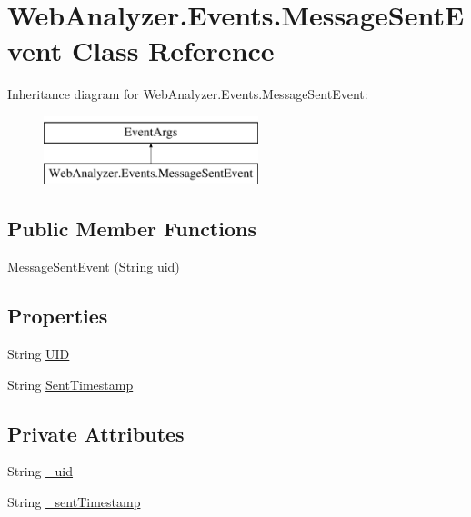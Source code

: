 \hypertarget{class_web_analyzer_1_1_events_1_1_message_sent_event}{}\section{Web\+Analyzer.\+Events.\+Message\+Sent\+Event Class Reference}
\label{class_web_analyzer_1_1_events_1_1_message_sent_event}
Inheritance diagram for Web\+Analyzer.\+Events.\+Message\+Sent\+Event\+:\begin{figure}[H]
\begin{center}
\leavevmode
\includegraphics[height=2.000000cm]{class_web_analyzer_1_1_events_1_1_message_sent_event}
\end{center}
\end{figure}
\subsection*{Public Member Functions}
\begin{DoxyCompactItemize}
\item 
\hyperlink{class_web_analyzer_1_1_events_1_1_message_sent_event_a20f49da5ed8a32d8af10923a0e3b1f0b}{Message\+Sent\+Event} (String uid)
\end{DoxyCompactItemize}
\subsection*{Properties}
\begin{DoxyCompactItemize}
\item 
String \hyperlink{class_web_analyzer_1_1_events_1_1_message_sent_event_a04217696019822bcc61e6890810b8442}{U\+I\+D}
\item 
String \hyperlink{class_web_analyzer_1_1_events_1_1_message_sent_event_a7408640c7a1d8de43f36ca70b01c49b0}{Sent\+Timestamp}
\end{DoxyCompactItemize}
\subsection*{Private Attributes}
\begin{DoxyCompactItemize}
\item 
String \hyperlink{class_web_analyzer_1_1_events_1_1_message_sent_event_a38d54d167e7fbe337cfe766aa47c1229}{\+\_\+uid}
\item 
String \hyperlink{class_web_analyzer_1_1_events_1_1_message_sent_event_acd4496065b9d2763ba985dfa43b15cfe}{\+\_\+sent\+Timestamp}
\end{DoxyCompactItemize}


